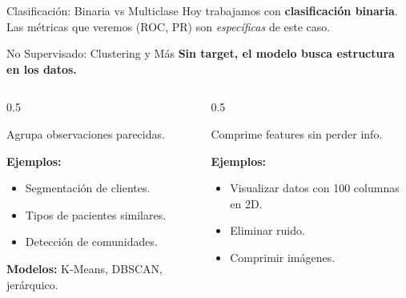 \documentclass[aspectratio=169, 11pt]{beamer}
\begin{document}
\begin{frame}{Clasificación: Binaria vs Multiclase}
  \vspace{8pt}
  {\footnotesize\color{textMuted}
    \faLightbulb\hspace{4pt} Hoy trabajamos con \textbf{clasificación binaria}.
    Las métricas que veremos (ROC, PR) son \textit{específicas} de este caso.}
\end{frame}

\begin{frame}{No Supervisado: Clustering y Más}
  \vspace{-4pt}
  {\footnotesize\color{arcaDark}\bfseries
    Sin target, el modelo busca \textbf{estructura} en los datos.}

  \vspace{6pt}
  \begin{columns}[T]
    \begin{column}{0.5\textwidth}
      \begin{tcolorbox}[colback=codePurple!8, colframe=codePurple, boxrule=0.5pt,
        arc=2pt, title={\small\color{white}\bfseries\faObjectGroup\ Clustering}]
        {\scriptsize
        Agrupa observaciones parecidas.
        \vspace{3pt}

        \textbf{Ejemplos:}
        \begin{itemize}\setlength{\itemsep}{2pt}
          \item Segmentación de clientes.
          \item Tipos de pacientes similares.
          \item Detección de comunidades.
        \end{itemize}

        \vspace{3pt}
        \textbf{Modelos:} K-Means, DBSCAN, jerárquico.}
      \end{tcolorbox}
    \end{column}
    \begin{column}{0.5\textwidth}
      \begin{tcolorbox}[colback=codeOrange!8, colframe=codeOrange, boxrule=0.5pt,
        arc=2pt, title={\small\color{white}\bfseries\faCompressArrowsAlt\ Reducción de Dim.}]
        {\scriptsize
        Comprime features sin perder info.
        \vspace{3pt}

        \textbf{Ejemplos:}
        \begin{itemize}\setlength{\itemsep}{2pt}
          \item Visualizar datos con 100 columnas en 2D.
          \item Eliminar ruido.
          \item Comprimir imágenes.
        \end{itemize}

}
\end{tcolorbox}
\end{column}
\end{columns}
\end{frame}
\end{document}

